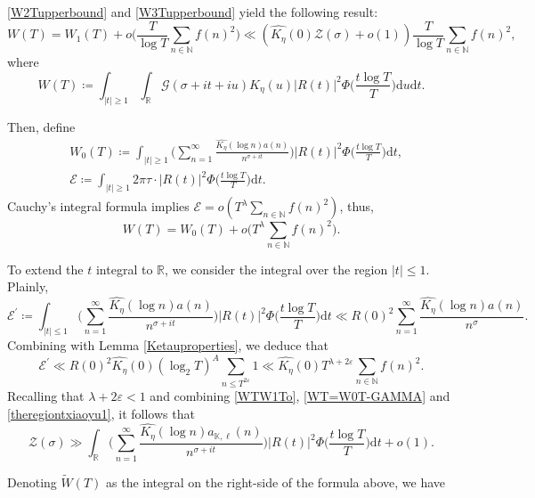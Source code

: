 \documentclass[12pt,reqno]{amsart}
\theoremstyle{definition}
\numberwithin{equation}{section}
\newcommand{\mbr}{\mathbb{R}}
\newcommand{\mbn}{\mathbb{N}}
\newcommand{\mce}{\mathcal{E}}
\newcommand{\mcg}{\mathcal{G}}
\newcommand{\mcz}{\mathcal{Z}}
\begin{document}
\eqref{W2Tupperbound} and \eqref{W3Tupperbound} yield the following result:
\begin{equation}
    \label{WTW1To}
    W(T) = W_1(T) + o\Big(\frac{T}{\log T} \sum_{n \in \mbn} f(n)^2\Big) \ll (\widehat{K_{\eta}}(0)\mcz(\sigma)+o(1))\frac{T}{\log T}\sum_{n \in \mbn} f(n)^2,
\end{equation}
where
$$
W(T) \coloneqq \int_{|t|\ge1}\int_\mbr\mcg(\sigma + it + iu)K_{\eta}(u)|R(t)|^{2}\Phi\Big(\frac{t\log T}{T}\Big)\mathrm{d}u\mathrm{d}t.
$$
\par
Then, define
\begin{align*}
    &W_0(T) \coloneqq \int_{|t| \ge 1}\Big(\sum_{n=1}^{\infty}\frac{\widehat{K_{\eta}}(\log n)a(n)}{n^{\sigma +it}}\Big)|R(t)|^{2}\Phi\Big(\frac{t\log T}{T}\Big)\mathrm{d}t, \\
    &\mce \coloneqq \int_{|t| \ge1} 2\pi \tau \cdot |R(t)|^{2}\Phi\Big(\frac{t\log T}{T}\Big)\mathrm{d}t.
\end{align*}
Cauchy's integral formula implies $\mce = o(T^{\lambda} \sum_{n \in \mbn}f(n)^2)$, thus,
\begin{equation}
    \label{WT=W0T-GAMMA}
    W(T) = W_0(T) + o\Big(T^{\lambda} \sum_{n \in \mbn}f(n)^2\Big).
\end{equation}
\par
To extend the $t$ integral to $\mbr$, we consider the integral over the region $|t| \le 1$. Plainly, 
$$
\mce^{\prime}\coloneqq\int_{|t| \le 1}\Big(\sum_{n=1}^{\infty}\frac{\widehat{K_{\eta}}(\log n)a(n)}{n^{\sigma +it}}\Big)|R(t)|^{2}\Phi\Big(\frac{t\log T}{T}\Big)\mathrm{d}t \ll R(0)^{2} \sum_{n=1}^{\infty}\frac{\widehat{K_{\eta}}(\log n)a(n)}{n^{\sigma}}.
$$
Combining with Lemma \ref{Ketauproperties}, we deduce that
\begin{equation}
\label{theregiontxiaoyu1}
    \mce^{\prime}\ll R(0)^{2} \widehat{K_{\eta}}(0) (\log_2 T)^A \sum_{n\leqslant T^{2\varepsilon}}1 \ll \widehat{K_{\eta}}(0) T^{\lambda + 2 \varepsilon} \sum_{n \in \mbn}f(n)^2.
\end{equation}
Recalling that $\lambda + 2\varepsilon <1$ and combining \eqref{WTW1To}, \eqref{WT=W0T-GAMMA} and \eqref{theregiontxiaoyu1}, it follows that
\begin{equation}
\label{ZKsigmaTgg}
    \mcz(\sigma) \gg \int_\mbr\Big(\sum_{n=1}^{\infty}\frac{\widehat{K_{\eta}}(\log n)a_{\mathbb{K},\ell}(n)}{n^{\sigma +it}}\Big)|R(t)|^{2}\Phi\Big(\frac{t\log T}{T}\Big)\mathrm{d}t + o(1).
\end{equation}
\par
Denoting $\widetilde{W}(T)$ as the integral on the right-side of the formula above, we have
\end{document}
